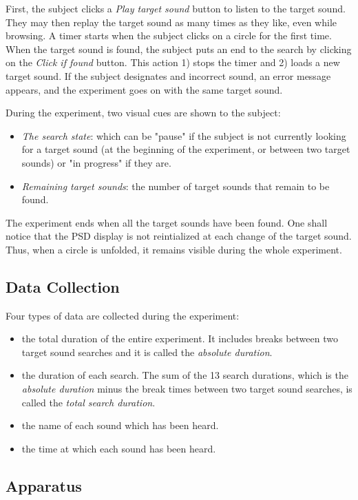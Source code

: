 \documentclass{aes2e}
\begin{document}
First, the subject clicks a \textit{Play target sound} button to listen to the target sound. They may then replay the target sound as many times as they like, even while browsing. A timer starts when the subject clicks on a circle for the first time. When the target sound is found, the subject puts an end to the search by clicking on the \textit{Click if found} button. This action 1) stops the timer and 2) loads a new target sound. If the subject designates and incorrect sound, an error message appears, and the experiment goes on with the same target sound.

During the experiment, two visual cues are shown to the subject:
\begin{itemize}
\item \textit{The search state}: which can be "pause" if the subject is not currently looking for a target sound (at the beginning of the experiment, or between two target sounds) or  "in progress"  if they are.
\item \textit{Remaining target sounds}: the number of target sounds that remain to be found.
\end{itemize}

The experiment ends when all the target sounds have been found. One shall notice that the PSD display is not reintialized at each change of the target sound. Thus, when a circle is unfolded, it remains visible during the whole experiment.

\subsection{Data Collection}
Four types of data are collected during the experiment:
\begin{itemize}
\item the total duration of the entire experiment. It includes breaks between two target sound searches and it is called the \textit{absolute duration}.
\item the duration of each search. The sum of the 13 search durations, which is the \textit{absolute duration} minus the break times between two target sound searches, is called the \textit{total search duration}.
\item the name of each sound which has been heard.
\item the time at which each sound has been heard.  
\end{itemize}

\subsection{Apparatus}
\end{document}
